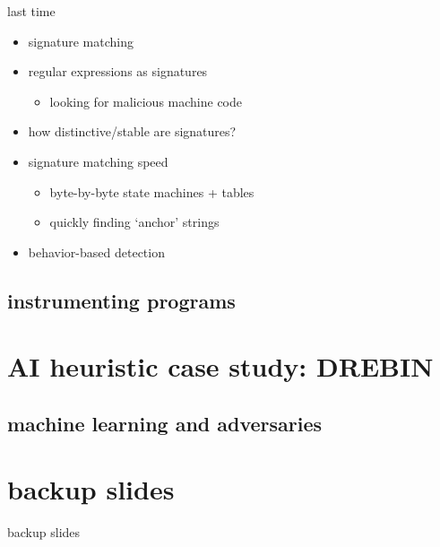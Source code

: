 \date{}
\title{}
\date{}

\begin{frame}
    \titlepage
\end{frame}

\begin{frame}{last time}
    \begin{itemize}
    \item signature matching
    \item regular expressions as signatures
        \begin{itemize}
        \item looking for malicious machine code
        \end{itemize}
    \item how distinctive/stable are signatures?
    \item signature matching speed
        \begin{itemize}
        \item byte-by-byte state machines + tables
        \item quickly finding `anchor' strings
        \end{itemize}
    \item behavior-based detection
    \end{itemize}
\end{frame}



\subsection{instrumenting programs}


\section{AI heuristic case study: DREBIN}


\subsection{machine learning and adversaries}




\section{backup slides}
\begin{frame}{backup slides}
\end{frame}





